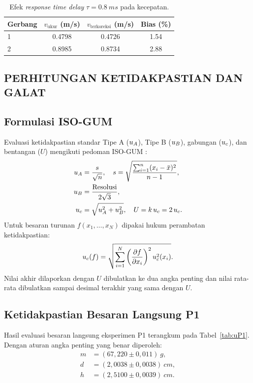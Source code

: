 \documentclass[a4paper, 12pt]{article}
\begin{document}
\begin{table}[H]
\centering
\singlespacing
\caption{Efek \textit{response time delay} $\tau=\SI{0,8}{ms}$ pada kecepatan.}
\label{tab:delay}
\small
\begin{tabular}{l S[table-format=1.4] S[table-format=1.4] S[table-format=1.2]}
\toprule
\textbf{Gerbang} & {$v_{\mathrm{ukur}}$ (m/s)} & {$v_{\mathrm{terkoreksi}}$ (m/s)} & {Bias (\%)}\\
 & 0.4798 & 0.4726 & 1.54\\
2 & 0.8985 & 0.8734 & 2.88\\
\bottomrule
\end{tabular}
\end{table}

\begin{multicols}{2}
    \raggedcolumns
    \section{PERHITUNGAN KETIDAKPASTIAN DAN GALAT}
        \subsection{Formulasi ISO-GUM}
        Evaluasi ketidakpastian standar Tipe A ($u_{A}$), Tipe B ($u_{B}$), gabungan ($u_{c}$), dan bentangan ($U$) mengikuti pedoman ISO-GUM \parencite{JCGM2008GUM}:
        \begin{align}
            u_{A} &= \frac{s}{\sqrt{n}},\quad s=\sqrt{\frac{\sum_{i=1}^{n}(x_i-\bar{x})^2}{n-1}},\label{eq:uA}\\
            u_{B} &= \frac{\text{Resolusi}}{2\sqrt{3}},\label{eq:uB}\\
            u_{c} &= \sqrt{u_{A}^{2}+u_{B}^{2}},\quad U=k\,u_{c}=2\,u_{c}.\label{eq:U}
        \end{align}
        Untuk besaran turunan $f(x_1,\dots,x_N)$ dipakai hukum perambatan ketidakpastian:
        \begin{equation}
            u_{c}(f)=\sqrt{\sum_{i=1}^{N}\left(\frac{\partial f}{\partial x_i}\right)^{2}u_{c}^{2}(x_i)}.
            \label{eq:prop}
        \end{equation}
        Nilai akhir dilaporkan dengan $U$ dibulatkan ke dua angka penting dan nilai rata-rata dibulatkan sampai desimal terakhir yang sama dengan $U$.

        \subsection{Ketidakpastian Besaran Langsung P1}
        Hasil evaluasi besaran langsung eksperimen P1 terangkum pada Tabel~\ref{tab:uP1}. Dengan aturan angka penting yang benar diperoleh:
        \begin{align*}
            m &= (67{,}220\pm0{,}011)\ \si{g},\\
            d &= (2{,}0038\pm0{,}0038)\ \si{cm},\\
            h &= (2{,}5100\pm0{,}0039)\ \si{cm}.
        \end{align*}


\end{multicols}
\end{document}
